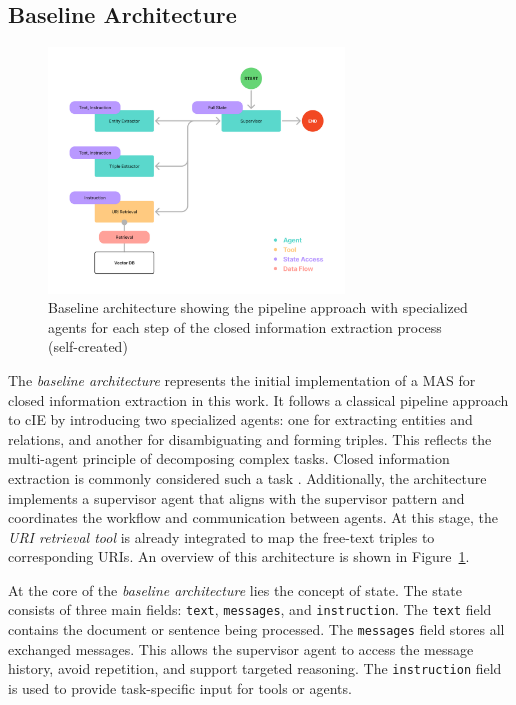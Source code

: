\documentclass[a4paper,oneside,bibliography=totoc]{scrbook}
\begin{document}
\subsection{Baseline Architecture}
\label{subsec:baseline}

\begin{figure}[tp]
  \centering
  \includegraphics[width=0.7\textwidth]{figures/Baseline Architecture.png}
  \caption[Baseline architecture showing the pipeline approach with specialized agents for each step of the closed information extraction process]{Baseline architecture showing the pipeline approach with specialized agents for each step of the closed information extraction process (self-created)}
  \label{fig:baseline_architecture}
\end{figure}

The \textit{baseline architecture} represents the initial implementation of a \ac{MAS} for closed information extraction in this work. It follows a classical pipeline approach to \ac{cIE} by introducing two specialized agents: one for extracting entities and relations, and another for disambiguating and forming triples. This reflects the multi-agent principle of decomposing complex tasks. Closed information extraction is commonly considered such a task \cite{Josifoski2021}. Additionally, the architecture implements a supervisor agent that aligns with the supervisor pattern and coordinates the workflow and communication between agents. At this stage, the \textit{URI retrieval tool} is already integrated to map the free-text triples to corresponding URIs. An overview of this architecture is shown in Figure~\ref{fig:baseline_architecture}.

At the core of the \textit{baseline architecture} lies the concept of state. The state consists of three main fields: \texttt{text}, \texttt{messages}, and \texttt{instruction}. The \texttt{text} field contains the document or sentence being processed. The \texttt{messages} field stores all exchanged messages. This allows the supervisor agent to access the message history, avoid repetition, and support targeted reasoning. The \texttt{instruction} field is used to provide task-specific input for tools or agents.
\end{document}
